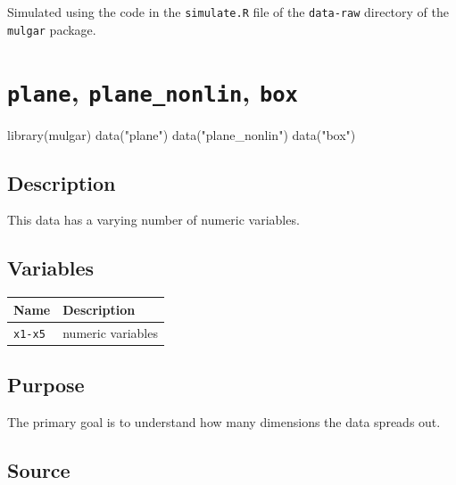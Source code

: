 \documentclass[
  letterpaper,
]{krantz}
\newenvironment{Shaded}{\begin{snugshade}}{\end{snugshade}}
\newcommand{\FunctionTok}[1]{\textcolor[rgb]{0.28,0.35,0.67}{#1}}
\newcommand{\NormalTok}[1]{\textcolor[rgb]{0.00,0.23,0.31}{#1}}
\newcommand{\StringTok}[1]{\textcolor[rgb]{0.13,0.47,0.30}{#1}}
\begin{document}
Simulated using the code in the \texttt{simulate.R} file of the
\texttt{data-raw} directory of the \texttt{mulgar} package.

\section{\texorpdfstring{\texttt{plane}, \texttt{plane\_nonlin},
\texttt{box}}{plane, plane\_nonlin, box}}\label{plane-plane_nonlin-box}

\begin{Shaded}
\begin{Highlighting}[]
\FunctionTok{library}\NormalTok{(mulgar)}
\FunctionTok{data}\NormalTok{(}\StringTok{"plane"}\NormalTok{)}
\FunctionTok{data}\NormalTok{(}\StringTok{"plane\_nonlin"}\NormalTok{)}
\FunctionTok{data}\NormalTok{(}\StringTok{"box"}\NormalTok{)}
\end{Highlighting}
\end{Shaded}

\subsection*{Description}\label{description-8}

This data has a varying number of numeric variables.

\subsection*{Variables}\label{variables-8}

\begin{longtable}[]{@{}ll@{}}
\toprule\noalign{}
Name & Description \\
\midrule\noalign{}
\endhead
\bottomrule\noalign{}
\endlastfoot
\texttt{x1-x5} & numeric variables \\
\end{longtable}

\subsection*{Purpose}\label{purpose-8}

The primary goal is to understand how many dimensions the data spreads
out.

\subsection*{Source}\label{source-8}
\end{document}
